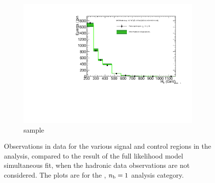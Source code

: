 \begin{figure}[h!]
\begin{subfigure}[b]{0.48\textwidth}
    \includegraphics[width=\textwidth,page=6]
    {Figs/results/v0/greenBand/bestFit_2012dev_RQcdZero_fZinvAll_1b_le3j-12p_smOnly}
    \caption{\gj sample}
  \end{subfigure}
  \caption{Observations in data for the various signal and control
  regions in the analysis, compared to the result of the full likelihood model
  simultaneous fit, when the hadronic data observations are not considered. The
  plots are for the \njlow, $n_{\text{b}} = 1$ analysis category.}
  \label{fig:green_fits_1b_le3j}
\end{figure}

